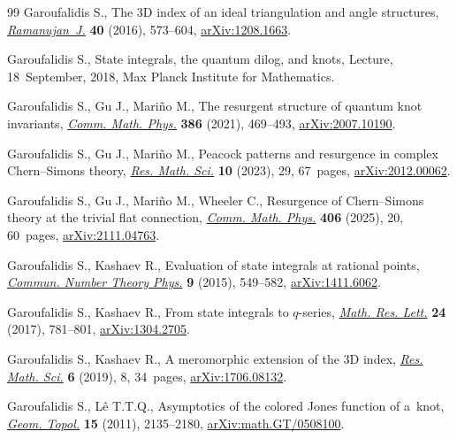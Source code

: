 \documentclass[pdftex]{sigma}
\numberwithin{equation}{section}
\begin{document}
\begin{thebibliography}{99}
Garoufalidis S., The 3{D} index of an ideal triangulation and angle structures,
  \href{https://doi.org/10.1007/s11139-016-9771-7}{\textit{Ramanujan~J.}} \textbf{40} (2016), 573--604, \href{https://arxiv.org/abs/1208.1663}{arXiv:1208.1663}.

Garoufalidis S., State integrals, the quantum dilog, and knots, {L}ecture,
  18~{S}eptember, 2018, {M}ax {P}lanck Institute for Mathematics.

Garoufalidis S., Gu J., Mari\~no M., The resurgent structure of quantum knot
  invariants, \href{https://doi.org/10.1007/s00220-021-04076-0}{\textit{Comm. Math. Phys.}} \textbf{386} (2021), 469--493,
  \href{https://arxiv.org/abs/2007.10190}{arXiv:2007.10190}.

Garoufalidis S., Gu J., Mari\~no M., Peacock patterns and resurgence in complex
  {C}hern--{S}imons theory, \href{https://doi.org/10.1007/s40687-023-00391-1}{\textit{Res. Math. Sci.}} \textbf{10} (2023), 29,
  67~pages, \href{https://arxiv.org/abs/2012.00062}{arXiv:2012.00062}.

Garoufalidis S., Gu J., Mari\~no M., Wheeler C., Resurgence of
  {C}hern--{S}imons theory at the trivial flat connection, \href{https://doi.org/10.1007/s00220-024-05149-6}{\textit{Comm. Math.
  Phys.}} \textbf{406} (2025), 20, 60~pages, \href{https://arxiv.org/abs/2111.04763}{arXiv:2111.04763}.

Garoufalidis S., Kashaev R., Evaluation of state integrals at rational points,
  \href{https://doi.org/10.4310/CNTP.2015.v9.n3.a3}{\textit{Commun. Number Theory Phys.}} \textbf{9} (2015), 549--582,
  \href{https://arxiv.org/abs/1411.6062}{arXiv:1411.6062}.

Garoufalidis S., Kashaev R., From state integrals to {$q$}-series,
  \href{https://doi.org/10.4310/MRL.2017.v24.n3.a8}{\textit{Math. Res. Lett.}} \textbf{24} (2017), 781--801, \href{https://arxiv.org/abs/1304.2705}{arXiv:1304.2705}.

Garoufalidis S., Kashaev R., A meromorphic extension of the 3{D} index,
  \href{https://doi.org/10.1007/s40687-018-0166-9}{\textit{Res. Math. Sci.}} \textbf{6} (2019), 8, 34~pages, \href{https://arxiv.org/abs/1706.08132}{arXiv:1706.08132}.

Garoufalidis S., L\^e T.T.Q., Asymptotics of the colored {J}ones function of
  a~knot, \href{https://doi.org/10.2140/gt.2011.15.2135}{\textit{Geom. Topol.}} \textbf{15} (2011), 2135--2180,
  \href{https://arxiv.org/abs/math.GT/0508100}{arXiv:math.GT/0508100}.


\end{thebibliography}
\end{document}
